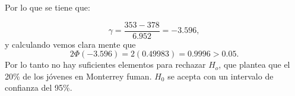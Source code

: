 \documentclass{article}
\begin{document}
Por lo que se tiene que:

\begin{equation}
    \gamma = \frac{353-378}{6.952}= -3.596,
  \end{equation}
    y calculando vemos clara mente que
   \begin{equation}
    2\Phi(-3.596)= 2(0.49983)= 0.9996>0.05.
  \end{equation}
  Por lo tanto no hay suficientes elementos para rechazar $H_o$, que plantea que el 20\% de los jóvenes en Monterrey fuman. $H_0$ se acepta con un intervalo de confianza del 95\%.
\newpage


\end{document}
